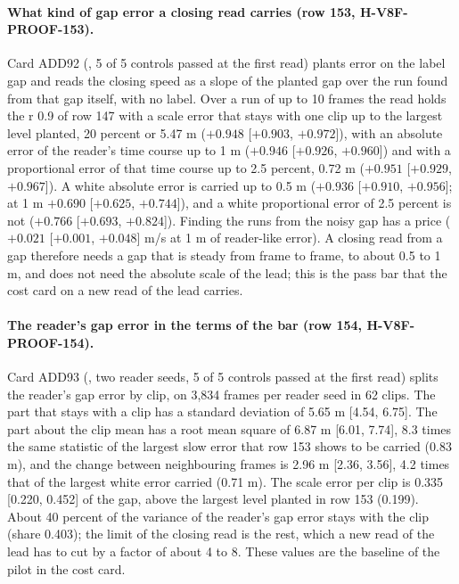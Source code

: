 \paragraph{What kind of gap error a closing read carries (row 153, H-V8F-PROOF-153).} Card ADD92 (, 5 of 5 controls passed at the first read) plants error on the label gap and reads the closing speed as a slope of the planted gap over the run found from that gap itself, with no label. Over a run of up to 10 frames the read holds the r 0.9 of row 147 with a scale error that stays with one clip up to the largest level planted, 20 percent or 5.47 m ($+0.948$ [$+0.903$, $+0.972$]), with an absolute error of the reader's time course up to 1 m ($+0.946$ [$+0.926$, $+0.960$]) and with a proportional error of that time course up to 2.5 percent, 0.72 m ($+0.951$ [$+0.929$, $+0.967$]). A white absolute error is carried up to 0.5 m ($+0.936$ [$+0.910$, $+0.956$]; at 1 m $+0.690$ [$+0.625$, $+0.744$]), and a white proportional error of 2.5 percent is not ($+0.766$ [$+0.693$, $+0.824$]). Finding the runs from the noisy gap has a price ($+0.021$ [$+0.001$, $+0.048$] m/s at 1 m of reader-like error). A closing read from a gap therefore needs a gap that is steady from frame to frame, to about 0.5 to 1 m, and does not need the absolute scale of the lead; this is the pass bar that the cost card on a new read of the lead carries.

\paragraph{The reader's gap error in the terms of the bar (row 154, H-V8F-PROOF-154).} Card ADD93 (, two reader seeds, 5 of 5 controls passed at the first read) splits the reader's gap error by clip, on 3,834 frames per reader seed in 62 clips. The part that stays with a clip has a standard deviation of 5.65 m [4.54, 6.75]. The part about the clip mean has a root mean square of 6.87 m [6.01, 7.74], 8.3 times the same statistic of the largest slow error that row 153 shows to be carried (0.83 m), and the change between neighbouring frames is 2.96 m [2.36, 3.56], 4.2 times that of the largest white error carried (0.71 m). The scale error per clip is 0.335 [0.220, 0.452] of the gap, above the largest level planted in row 153 (0.199). About 40 percent of the variance of the reader's gap error stays with the clip (share 0.403); the limit of the closing read is the rest, which a new read of the lead has to cut by a factor of about 4 to 8. These values are the baseline of the pilot in the cost card.

